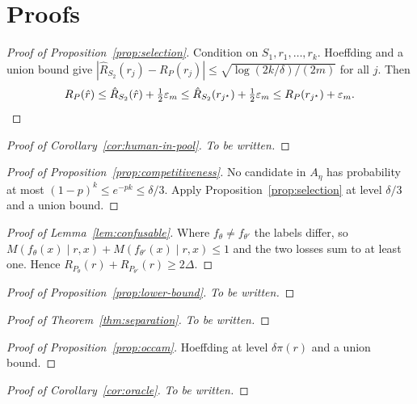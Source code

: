 \section{Proofs}\label{app:proofs}

\begin{proof}[Proof of Proposition~\ref{prop:selection}]
Condition on $S_1,r_1,\dots,r_k$.
Hoeffding and a union bound give $|\hat R_{S_2}(r_j)-R_P(r_j)|\le\sqrt{\log(2k/\delta)/(2m)}$ for all $j$.
Then
%
\[
R_P(\hat r)\le\hat R_{S_2}(\hat r)+\tfrac12\varepsilon_m\le\hat R_{S_2}(r_{j^\star})+\tfrac12\varepsilon_m\le R_P(r_{j^\star})+\varepsilon_m.
\qedhere
\]
\end{proof}

\begin{proof}[Proof of Corollary~\ref{cor:human-in-pool}]
\emph{To be written.}
\end{proof}

\begin{proof}[Proof of Proposition~\ref{prop:competitiveness}]
No candidate in $A_\eta$ has probability at most $(1-p)^k\le e^{-pk}\le\delta/3$.
Apply Proposition~\ref{prop:selection} at level $\delta/3$ and a union bound.
\end{proof}

\begin{proof}[Proof of Lemma~\ref{lem:confusable}]
Where $f_\theta\ne f_{\theta'}$ the labels differ, so $M(f_\theta(x)\mid r,x)+M(f_{\theta'}(x)\mid r,x)\le1$ and the two losses sum to at least one.
Hence $R_{P_\theta}(r)+R_{P_{\theta'}}(r)\ge2\Delta$.
\end{proof}

\begin{proof}[Proof of Proposition~\ref{prop:lower-bound}]
\emph{To be written.}
\end{proof}

\begin{proof}[Proof of Theorem~\ref{thm:separation}]
\emph{To be written.}
\end{proof}

\begin{proof}[Proof of Proposition~\ref{prop:occam}]
Hoeffding at level $\delta\pi(r)$ and a union bound.
\end{proof}

\begin{proof}[Proof of Corollary~\ref{cor:oracle}]
\emph{To be written.}
\end{proof}

